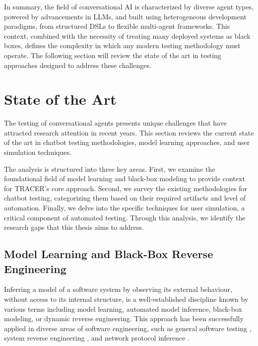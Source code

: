 \indent

In summary,
the field of conversational \ac{AI} is characterized by diverse agent types,
powered by advancements in \acp{LLM},
and built using heterogeneous development paradigms,
from structured \acp{DSL} to flexible multi-agent frameworks.
This context, combined with the necessity of treating many deployed systems as black boxes,
defines the complexity in which any modern testing methodology must operate.
The following section will review the state of the art in testing approaches designed to address these challenges.

\section{State of the Art}\label{sec:sota}

The testing of conversational agents presents unique challenges
that have attracted research attention in recent years.
This section reviews the current state of the art in
chatbot testing methodologies, model learning approaches, and user simulation techniques.

The analysis is structured into three key areas.
First, we examine the foundational field of model learning
and black-box modeling to provide context for TRACER's core approach.
Second, we survey the existing methodologies for chatbot testing,
categorizing them based on their required artifacts and level of automation.
Finally, we delve into the specific techniques for user simulation,
a critical component of automated testing.
Through this analysis, we identify the research gaps that this thesis aims to address.

\subsection{Model Learning and Black-Box Reverse Engineering}

Inferring a model of a software system by observing its external behaviour,
without access to its internal structure,
is a well-established discipline known by various terms including
model learning, automated model inference, black-box modeling, or dynamic reverse engineering.
This approach has been successfully applied in diverse areas of software engineering,
such as general software testing \autocite{aichernigModelLearningModelBased2018},
system reverse engineering \autocite{hajipourIReEnReverseEngineeringBlackBox2021, menguyBlackboxCodeAnalysis2023},
and network protocol inference \autocite{luoDynPREProtocolReverse}.

